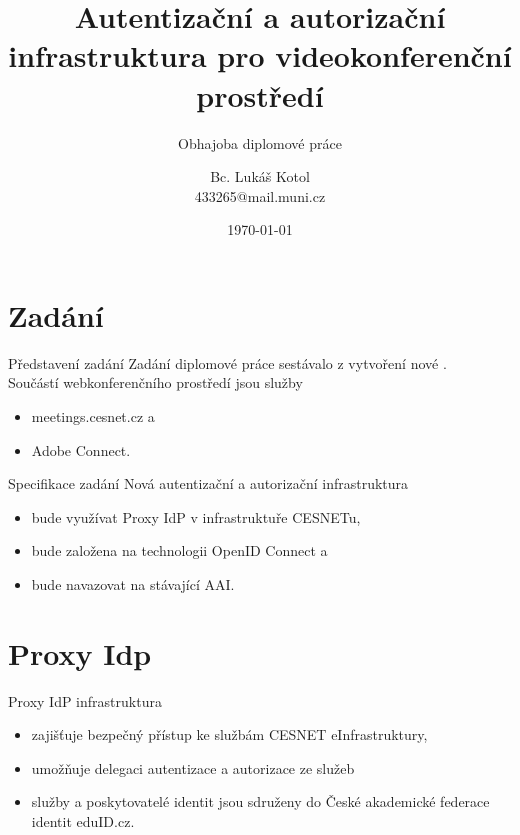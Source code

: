 \documentclass[
]{beamer}
\begin{document}
\title[Obhajoba diplomové práce]{Autentizační a autorizační infrastruktura pro videokonferenční prostředí}
\subtitle[Short Presentation Subtitle]{Obhajoba diplomové práce}
\author[L.\,Kotol]{Bc. Lukáš Kotol \\ 433265@mail.muni.cz}
\date{\today}
\subject{Presentation Subject}

\begin{frame}[plain]
\maketitle
\end{frame}

\section[Zadání]{Zadání}

\begin{frame}{Představení zadání}{}
Zadání diplomové práce sestávalo z vytvoření nové . 
\\
\medskip
Součástí webkonferenčního prostředí jsou služby
\begin{itemize}
  \item meetings.cesnet.cz a
  \item Adobe Connect.
\end{itemize}
\end{frame}

\begin{frame}{Specifikace zadání}
Nová autentizační a autorizační infrastruktura 
\begin{itemize}
  \item bude využívat Proxy IdP v infrastruktuře CESNETu,
  \item bude založena na technologii OpenID Connect a
  \item bude navazovat na stávající AAI. 
\end{itemize}
\end{frame}

\section[Proxy Idp]{Proxy Idp}
\begin{frame}{Proxy IdP infrastruktura}
\begin{itemize}
    \item zajišťuje bezpečný přístup ke službám CESNET eInfrastruktury,
    \item umožňuje delegaci autentizace a autorizace ze služeb 
    \item služby a poskytovatelé identit jsou sdruženy do České akademické federace identit eduID.cz.

\end{itemize}
\end{frame}
\end{document}
